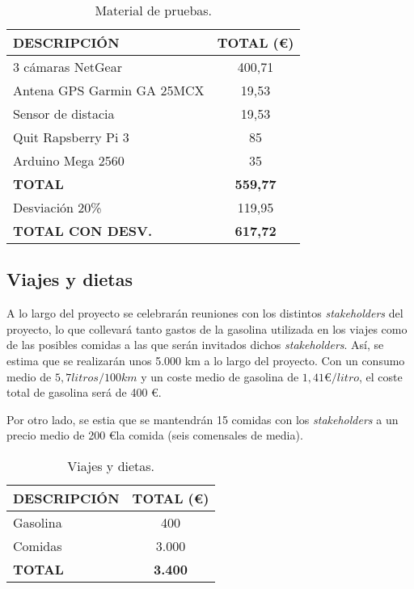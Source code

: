 \begin{table}[H]
\begin{center}
\begin{tabular}{l c}
\textbf{DESCRIPCIÓN} & \textbf{TOTAL (\euro)}\\ \hline \hline
3 cámaras NetGear & 400,71\\
Antena GPS Garmin GA 25MCX & 19,53\\
Sensor de distacia & 19,53\\
Quit Rapsberry Pi 3 & 85\\
Arduino Mega 2560 & 35\\ \hline \hline
\textbf{TOTAL} & \textbf{559,77}\\ \hline
Desviación 20\% & 119,95\\ \hline  \hline
\textbf{TOTAL CON DESV.} & \textbf{617,72}\\ \hline
\end{tabular}
\caption{Material de pruebas.}
\label{tab:pruebas}
\end{center}
\end{table}


\subsection{Viajes y dietas}
\par A lo largo del proyecto se celebrarán reuniones con los distintos \textit{stakeholders} del proyecto, lo que collevará tanto gastos de la gasolina utilizada en los viajes como de las posibles comidas a las que serán invitados dichos \textit{stakeholders}. Así, se estima que se realizarán unos 5.000 km a lo largo del proyecto. Con un consumo medio de $5,7 litros /100km$ y un coste medio de gasolina de $1,41 \euro/litro$, el coste total de gasolina será de 400 \euro.
\par Por otro lado, se estia que se mantendrán 15 comidas con los \textit{stakeholders} a un precio medio de 200 \euro la comida (seis comensales de media).

\begin{table}[H]
\begin{center}
\begin{tabular}{l c}
\textbf{DESCRIPCIÓN} & \textbf{TOTAL (\euro)}\\ \hline \hline
Gasolina & 400\\
Comidas & 3.000\\ \hline \hline
\textbf{TOTAL} & \textbf{3.400}\\ \hline
\end{tabular}
\caption{Viajes y dietas.}
\label{tab:viajes}
\end{center}
\end{table}


